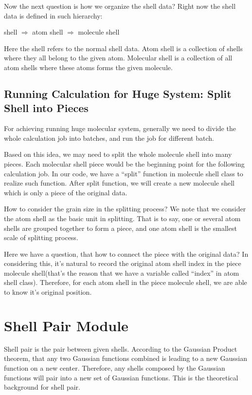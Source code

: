 Now the next question is how we organize the shell data? Right now 
the shell data is defined in such hierarchy:
\begin{center}
shell $\Rightarrow$ atom shell $\Rightarrow$ molecule shell
\end{center}

Here the shell refers to the normal shell data.
Atom shell is a collection of shells where they all belong to the given atom. 
Molecular shell is a collection of all atom shells where these atoms forms
the given molecule. 

\subsection{Running Calculation for Huge System: Split Shell into Pieces}

For achieving running huge molecular system, generally we need to divide
the whole calculation job into batches, and run the job for different batch.

Based on this idea, we may need to split the whole molecule shell into many pieces.
Each molecular shell piece would be the beginning point for the following calculation job.
In our code, we have a ``split'' function in molecule shell class to realize 
such function. After split function, we will create a new molecule shell
which is only a piece of the original data. 

How to consider the grain size in the splitting process? We note that 
we consider the atom shell as the basic unit in splitting. That is 
to say, one or several atom shells are grouped together to form a 
piece, and one atom shell is the smallest scale of splitting process.

Here we have a question, that how to connect the piece with the original
data? In considering this, it's natural to record the original atom shell 
index in the piece molecule shell(that's the reason that we have a variable
called ``index'' in atom shell class). Therefore, for each atom shell in the 
piece molecule shell, we are able to know it's original position.

\section{Shell Pair Module}
 
Shell pair is the pair between given shells. According to the Gaussian Product
theorem, that any two Gaussian functions combined is leading to a new Gaussian
function on a new center. Therefore, any shells composed by the Gaussian functions
will pair into a new set of Gaussian functions. This is the theoretical background
for shell pair. 
  
